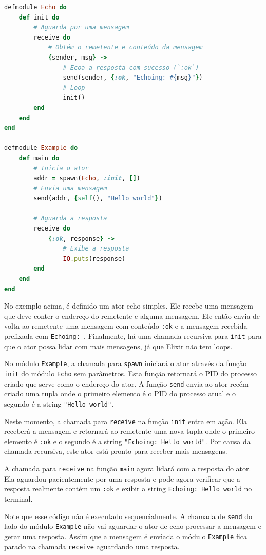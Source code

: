 \begin{lstlisting}[language=ruby, caption=Exemplo de Ator Echo em Elixir]
defmodule Echo do
    def init do
        # Aguarda por uma mensagem
        receive do
            # Obtém o remetente e conteúdo da mensagem
            {sender, msg} -> 
                # Ecoa a resposta com sucesso (`:ok`)
                send(sender, {:ok, "Echoing: #{msg}"})
                # Loop
                init()
        end
    end
end

defmodule Example do
    def main do
        # Inicia o ator
        addr = spawn(Echo, :init, []) 
        # Envia uma mensagem
        send(addr, {self(), "Hello world"}) 
        
        # Aguarda a resposta
        receive do 
            {:ok, response} -> 
                # Exibe a resposta
                IO.puts(response) 
        end
    end
end
\end{lstlisting}

No exemplo acima, é definido um ator echo simples. Ele recebe uma mensagem que deve conter o endereço do remetente e alguma mensagem. Ele então envia de volta ao remetente uma mensagem com conteúdo \texttt{:ok} e a mensagem recebida prefixada com \texttt{Echoing: }. Finalmente, há uma chamada recursiva para \texttt{init} para que o ator possa lidar com mais mensagens, já que Elixir não tem loops.

No módulo \texttt{Example}, a chamada para \texttt{spawn} iniciará o ator através da função \texttt{init} do módulo \texttt{Echo} sem parâmetros. Esta função retornará o PID do processo criado que serve como o endereço do ator. A função \texttt{send} envia ao ator recém-criado uma tupla onde o primeiro elemento é o PID do processo atual e o segundo é a string \texttt{"Hello world"}.

Neste momento, a chamada para \texttt{receive} na função \texttt{init} entra em ação. Ela receberá a mensagem e retornará ao remetente uma nova tupla onde o primeiro elemento é \texttt{:ok} e o segundo é a string \texttt{"Echoing: Hello world"}. Por causa da chamada recursiva, este ator está pronto para receber mais mensagens.

A chamada para \texttt{receive} na função \texttt{main} agora lidará com a resposta do ator. Ela aguardou pacientemente por uma resposta e pode agora verificar que a resposta realmente contém um \texttt{:ok} e exibir a string \texttt{Echoing: Hello world} no terminal.

Note que esse código não é executado sequencialmente. A chamada de \texttt{send} do lado do módulo \texttt{Example} não vai aguardar o ator de echo processar a mensagem e gerar uma resposta. Assim que a mensagem é enviada o módulo \texttt{Example} fica parado na chamada \texttt{receive} aguardando uma resposta.
